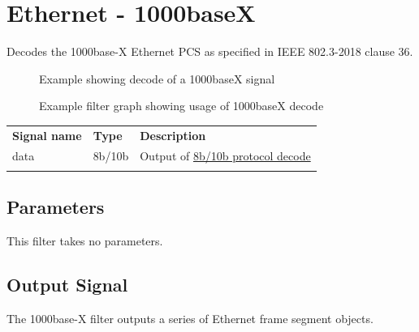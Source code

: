 \pagebreak
\section{Ethernet - 1000baseX}
\label{filter:1000basex}

Decodes the 1000base-X Ethernet PCS as specified in IEEE 802.3-2018 clause 36.

\begin{figure}[h]
\centering
{}
\caption{Example showing decode of a 1000baseX signal}
\label{filter_1000basex}
\end{figure}

\begin{figure}[h]
\centering
{}
\caption{Example filter graph showing usage of 1000baseX decode}
\label{filter_graph_1000basex}
\end{figure}

\FloatBarrier

\begin{tabularx}{16cm}{llX}
\thickhline
\textbf{Signal name} & \textbf{Type} & \textbf{Description} \\
\thickhline
data & 8b/10b & Output of \hyperref[proto:8b10b]{8b/10b protocol decode}\\
\thickhline
\end{tabularx}

\subsection{Parameters}

This filter takes no parameters.

\subsection{Output Signal}

The 1000base-X filter outputs a series of Ethernet frame segment objects.

